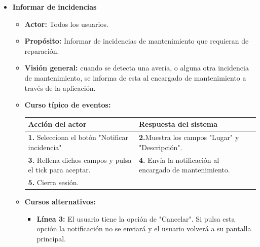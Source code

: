 \documentclass[spanish,a4paper,12pt]{report}		%
\begin{document}
\begin{itemize}
		\item \textbf{Informar de incidencias}	
			\begin{itemize}
				\item \textbf{Actor: }Todos los usuarios.
				\item \textbf{Propósito: }Informar de incidencias de mantenimiento que requieran de reparación. 		
				\item \textbf{Visión general: }cuando se detecta una avería, o alguna otra incidencia de mantenimiento, se informa de esta al encargado de mantenimiento a través de la aplicación.  
				\item \textbf{Curso típico de eventos:}\\ 
				\begin{tabular}{|p{6cm}||p{6cm}|}
					\hline
					\textbf{Acción del actor} & \textbf{Respuesta del sistema} \\ \hline \hline
					\textbf{1.} Selecciona el botón "Notificar incidencia" & \textbf{2.}Muestra los campos "Lugar" y "Descripción".\\ \hline 
					\textbf{3.} Rellena dichos campos y pulsa el tick para aceptar. & \textbf{4.} Envía la notificación al encargado de mantenimiento.\\ \hline
					\textbf{5.} Cierra sesión. & \\ \hline

				\end{tabular}
				\item \textbf{Cursos alternativos:} 
					\begin{itemize}
						\item \textbf{Línea 3: }El usuario tiene la opción de "Cancelar". Si pulsa esta opción la notificación no se enviará y el usuario volverá a su pantalla principal.
					\end{itemize}
			\end {itemize}


\end{itemize}
\end{document}
